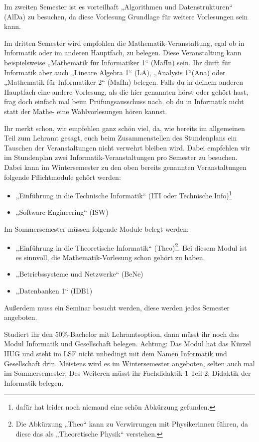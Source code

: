 Im zweiten Semester ist es vorteilhaft „Algorithmen und Datenstrukturen“ (\gls{AlDa}) zu besuchen, da diese Vorlesung Grundlage für weitere Vorlesungen sein kann. 

Im dritten Semester wird empfohlen die Mathematik-Veranstaltung, egal ob in Informatik oder im anderen Hauptfach, zu belegen. Diese Veranstaltung kann beispielsweise „Mathematik für Informatiker 1“ (\gls{MafIn}) sein. Ihr dürft für Informatik aber auch „Lineare Algebra 1“ (\gls{LA}), „Analysis 1“(\gls{Ana}) oder „Mathematik für Informatiker 2“ (\gls{MafIn}) belegen. Falls du in deinem anderen Hauptfach eine andere Vorlesung, als die hier genannten hörst oder gehört hast, frag doch einfach mal beim Prüfungsausschuss nach, ob du in Informatik nicht statt der Mathe- eine Wahlvorlesungen hören kannst.

Ihr merkt schon, wir empfehlen ganz schön viel, da, wie bereits im allgemeinen Teil zum Lehramt gesagt, euch beim Zusammenstellen des Stundenplans ein Tauschen der Veranstaltungen nicht verwehrt bleiben wird. Dabei empfehlen wir im Stundenplan zwei Informatik-Veranstaltungen pro Semester zu besuchen. Dabei kann im Wintersemester zu den oben bereits genannten Veranstaltungen folgende Pflichtmodule gehört werden: 
\begin{itemize}
    \item „Einführung in die Technische Informatik“ (\gls{ITI} oder Technische Info)\footnote{dafür hat leider noch niemand eine schön Abkürzung gefunden.}
    \item „Software Engineering“ (\gls{ISW})
\end{itemize}
Im Sommersemester müssen folgende Module belegt werden:
\begin{itemize}
    \item „Einführung in die Theoretische Informatik“ (\gls{Theo})\footnote{Die Abkürzung „Theo“ kann zu Verwirrungen mit Physikerinnen führen, da diese das als „Theoretische Physik“ verstehen.}. Bei diesem Modul ist es sinnvoll, die Mathematik-Vorlesung schon gehört zu haben.
    \item „Betriebssysteme und Netzwerke“ (\gls{BeNe})
    \item „Datenbanken 1“ (\gls{IDB1})
\end{itemize}
Außerdem muss ein Seminar besucht werden, diese werden jedes Semester angeboten. 

Studiert ihr den 50\%-Bachelor mit Lehramtsoption, dann müsst ihr noch das Modul Informatik und Gesellschaft belegen. Achtung: Das Modul hat das Kürzel IIUG und steht im LSF nicht unbedingt mit dem Namen Informatik und Gesellschaft drin. Meistens wird es im Wintersemester angeboten, selten auch mal im Sommersemester. Des Weiteren müsst ihr Fachdidaktik 1 Teil 2: Didaktik der Informatik belegen. 

